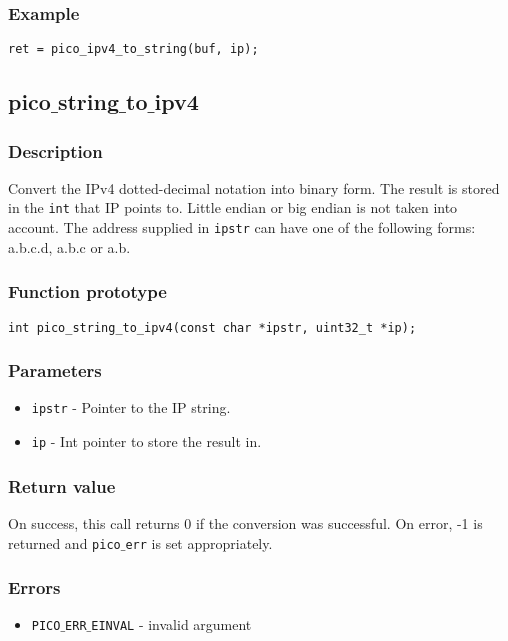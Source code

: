 \subsubsection*{Example}
\begin{verbatim}
ret = pico_ipv4_to_string(buf, ip);
\end{verbatim}



\subsection{pico$\_$string$\_$to$\_$ipv4}

\subsubsection*{Description}
Convert the IPv4 dotted-decimal notation into binary form. The result is stored in the
\texttt{int} that IP points to. Little endian or big endian is not taken into account.
The address supplied in \texttt{ipstr} can have one of the following
forms: a.b.c.d, a.b.c or a.b.

\subsubsection*{Function prototype}
\begin{verbatim}
int pico_string_to_ipv4(const char *ipstr, uint32_t *ip); 
\end{verbatim}

\subsubsection*{Parameters}
\begin{itemize}[noitemsep]
\item \texttt{ipstr} - Pointer to the IP string.
\item \texttt{ip} - Int pointer to store the result in.
\end{itemize}

\subsubsection*{Return value}
On success, this call returns 0 if the conversion was successful.
On error, -1 is returned and \texttt{pico$\_$err} is set appropriately.

\subsubsection*{Errors}
\begin{itemize}[noitemsep]
\item \texttt{PICO$\_$ERR$\_$EINVAL} - invalid argument
\end{itemize}

